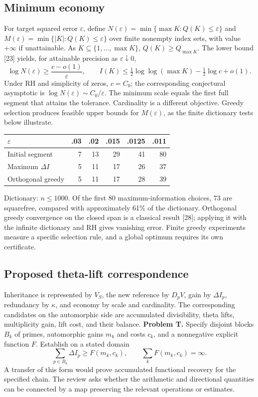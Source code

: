 \documentclass[11pt,a4paper]{article}
\begin{document}
\subsection{Minimum economy}
For target squared error $\varepsilon$, define $N(\varepsilon)=\min\{\max K:Q(K)\le\varepsilon\}$ and $M(\varepsilon)=\min\{|K|:Q(K)\le\varepsilon\}$ over finite nonempty index sets, with value $+\infty$ if unattainable. As $K\subseteq\{1,\ldots,\max K\}$, $Q(K)\ge Q_{\max K}$. The lower bound [23] yields, for attainable precision as $\varepsilon\downarrow0$,
\[\log N(\varepsilon)\ge\frac{c-o(1)}{\varepsilon},\qquad I(K)\le\tfrac12\log\log(\max K)-\tfrac12\log c+o(1).\]
Under RH and simplicity of zeros, $c=C_0$; the corresponding conjectural asymptotic is $\log N(\varepsilon)\sim C_0/\varepsilon$. The minimum scale equals the first full segment that attains the tolerance. Cardinality is a different objective. Greedy selection produces feasible upper bounds for $M(\varepsilon)$, as the finite dictionary tests below illustrate.
\begin{center}\small\begin{tabular}{@{}lrrrrr@{}}\toprule
$\varepsilon$&.03&.02&.015&.0125&.011\\\midrule
Initial segment&7&13&29&41&80\\
Maximum $\Delta I$&5&11&17&26&37\\
Orthogonal greedy&5&11&17&28&39\\\bottomrule\end{tabular}\end{center}
Dictionary: $n\le1000$. Of the first 80 maximum-information choices, 73 are squarefree, compared with approximately 61\% of the dictionary. Orthogonal greedy convergence on the closed span is a classical result [28]; applying it with the infinite dictionary and RH gives vanishing error. Finite greedy experiments measure a specific selection rule, and a global optimum requires its own certificate.
\subsection{Proposed theta-lift correspondence}
Inheritance is represented by $V_S$, the new reference by $D_pV$, gain by $\Delta I_p$, redundancy by $\kappa$, and economy by scale and cardinality. The corresponding candidates on the automorphic side are accumulated divisibility, theta lifts, multiplicity gain, lift cost, and their balance.
\textbf{Problem T.} Specify disjoint blocks $B_k$ of primes, automorphic gains $m_k$ and costs $c_k$, and a nonnegative explicit function $F$. Establish on a stated domain
\[\sum_{p\in B_k}\Delta I_p\ge F(m_k,c_k),\qquad \sum_k F(m_k,c_k)=\infty.\]
A transfer of this form would prove accumulated functional recovery for the specified chain. The review asks whether the arithmetic and directional quantities can be connected by a map preserving the relevant operations or estimates.
\end{document}
